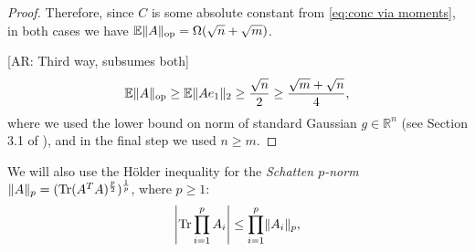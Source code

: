 \documentclass[aos]{imsart}
\theoremstyle{definition}
\numberwithin{equation}{section}
\DeclareMathOperator{\op}{op}
\DeclareMathOperator{\tr}{Tr}
\DeclarePairedDelimiter{\abs}{\lvert}{\rvert}
\DeclarePairedDelimiter{\norm}{\lVert}{\rVert}
\newcommand{\R}{{\mathbb{R}}}
\newcommand{\E}{\mathbb{E}}
\newcommand{\AR}[1]{{\color{orange}[AR: #1]}}
\begin{document}
\begin{appendix}
\begin{proof}
Therefore, since $C$ is some absolute constant from \cref{eq:conc via moments}, in both cases we have $\E \norm{A}_{\op} = \Omega(\sqrt{n} + \sqrt{m}) $. 

\AR{Third way, subsumes both}
\[ \E \norm{A}_{\op} \geq \E \norm{A e_{1}}_{2} \geq \frac{\sqrt{n}}{2} \geq \frac{\sqrt{m} + \sqrt{n}}{4}   ,  \]
where we used the lower bound on norm of standard Gaussian $g \in \R^{n}$ (see Section 3.1 of \cite{ENormLB}), and in the final step we used $n \geq m$. 
\end{proof}


We will also use the H\"older inequality for the \emph{Schatten $p$-norm} $\norm{A}_p = (\tr(A^TA)^{\frac p2})^{\frac1p}$, where $p\geq1$:
\begin{align}\label{eq:holder}
  \abs*{\tr \prod_{i=1}^{p} A_i} \leq \prod_{i=1}^{p} \norm{A_i}_p,
\end{align}


\end{appendix}
\end{document}
